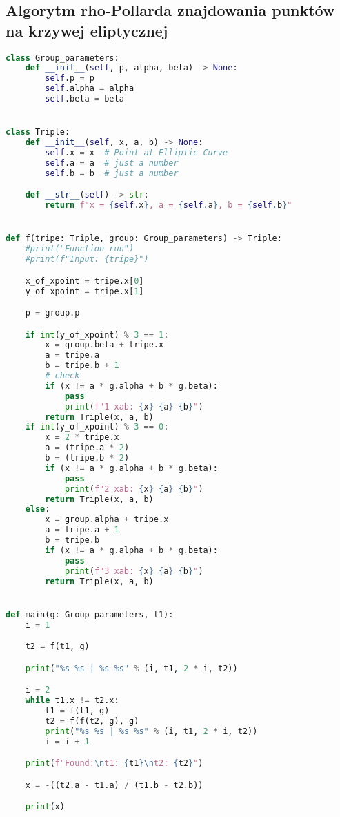\subsection{Algorytm rho-Pollarda znajdowania punktów na krzywej eliptycznej}
\begin{lstlisting}[language=python]
class Group_parameters:
    def __init__(self, p, alpha, beta) -> None:
        self.p = p
        self.alpha = alpha
        self.beta = beta


class Triple:
    def __init__(self, x, a, b) -> None:
        self.x = x  # Point at Elliptic Curve
        self.a = a  # just a number
        self.b = b  # just a number

    def __str__(self) -> str:
        return f"x = {self.x}, a = {self.a}, b = {self.b}"


def f(tripe: Triple, group: Group_parameters) -> Triple:
    #print("Function run")
    #print(f"Input: {tripe}")

    x_of_xpoint = tripe.x[0]
    y_of_xpoint = tripe.x[1]

    p = group.p

    if int(y_of_xpoint) % 3 == 1:
        x = group.beta + tripe.x
        a = tripe.a
        b = tripe.b + 1
        # check 
        if (x != a * g.alpha + b * g.beta):
            pass
            print(f"1 xab: {x} {a} {b}")
        return Triple(x, a, b)
    if int(y_of_xpoint) % 3 == 0:
        x = 2 * tripe.x
        a = (tripe.a * 2)
        b = (tripe.b * 2)
        if (x != a * g.alpha + b * g.beta):
            pass
            print(f"2 xab: {x} {a} {b}")
        return Triple(x, a, b)
    else:
        x = group.alpha + tripe.x
        a = tripe.a + 1
        b = tripe.b
        if (x != a * g.alpha + b * g.beta):
            pass
            print(f"3 xab: {x} {a} {b}")
        return Triple(x, a, b)


def main(g: Group_parameters, t1):
    i = 1

    t2 = f(t1, g)

    print("%s %s | %s %s" % (i, t1, 2 * i, t2))

    i = 2
    while t1.x != t2.x:
        t1 = f(t1, g)
        t2 = f(f(t2, g), g)
        print("%s %s | %s %s" % (i, t1, 2 * i, t2))
        i = i + 1

    print(f"Found:\nt1: {t1}\nt2: {t2}")

    x = -((t2.a - t1.a) / (t1.b - t2.b))

    print(x)
\end{lstlisting}